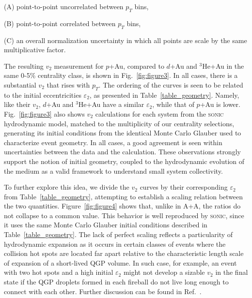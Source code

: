 \documentclass[%
reprint,
showpacs,preprintnumbers,
 amsmath,amssymb,
 aps,
]{revtex4-1}
\newcommand{\pt}{\mbox{$p_T$}\xspace}
\newcommand{\dau}{\mbox{$d$+Au}\xspace}
\newcommand{\pau}{\mbox{$p$+Au}\xspace}
\newcommand{\hau}{\mbox{$^3\text{He}$+Au}\xspace}
\begin{document}
(A) point-to-point uncorrelated between $p_T$ bins,

(B) point-to-point correlated between $p_T$ bins,

(C) an overall normalization uncertainty in which all points are scale by the same multiplicative factor.

The resulting $v_2$ measurement for \pau, compared to \dau and \hau in the same 0-5\% centrality class, is shown in Fig.~\ref{fig:figure3}. In all cases, there is a substantial $v_2$ that rises with \pt. The ordering of the curves is seen to be related to the initial eccentricities $\varepsilon_2$, as presented in Table~\ref{table_geometry}. Namely, like their $v_2$, \dau and \hau have a similar $\varepsilon_2$, while that of \pau is lower. Fig.~\ref{fig:figure3} also shows $v_2$ calculations for each system from the \textsc{sonic}~\cite{Habich:2014jna} hydrodynamic model, matched to the multiplicity of our centrality selections, generating its initial conditions from the identical Monte Carlo Glauber used to characterize event geometry. In all cases, a good agreement is seen within uncertainties between the data and the calculation. These observations strongly support the notion of initial geometry, coupled to the hydrodynamic evolution of the medium as a valid framework to understand small system collectivity.

To further explore this idea, we divide the $v_2$ curves by their corresponding $\varepsilon_2$ from Table~\ref{table_geometry}, attempting to establish a scaling relation between the two quantities. Figure~\ref{fig:figure4} shows that, unlike in A+A, the ratios do not collapse to a common value. This behavior is well reproduced by  \textsc{sonic}, since it uses the same Monte Carlo Glauber initial conditions described in Table~\ref{table_geometry}. The lack of perfect scaling reflects a particularity of hydrodynamic expansion as it occurs in certain classes of events where the collision hot spots are located far apart relative to the characteristic length scale of expansion of a short-lived QGP volume. In such case, for example, an event with two hot spots and a high initial $\varepsilon_2$ might not develop a sizable $v_2$ in the final state if the QGP droplets formed in each fireball do not live long enough to connect with each other. Further discussion can be found in Ref.~\cite{nagle_exploiting_2013}. 
\end{document}

